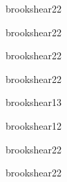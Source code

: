 \begin{syllabus}
\begin{unit}{\OSOverviewofOperatingSystemsDef}{brookshear}{2}{2}
    \OSOverviewofOperatingSystemsAllTopics
    \OSOverviewofOperatingSystemsAllObjectives
\end{unit}

\begin{unit}{\NCIntroductionDef}{brookshear}{2}{2}
   \NCIntroductionAllTopics
   \NCIntroductionAllObjectives
\end{unit}

\begin{unit}{\PLOverviewDef}{brookshear}{2}{2}
    \PLOverviewAllTopics
    \PLOverviewAllObjectives
\end{unit}

\begin{unit}{\PLVirtualMachinesDef}{brookshear}{2}{2}
    \PLVirtualMachinesAllTopics
    \PLVirtualMachinesAllObjectives
\end{unit}

\begin{unit}{\PLObjectOrientedProgrammingDef}{brookshear}{1}{3}
    \PLObjectOrientedProgrammingAllTopics
    \PLObjectOrientedProgrammingAllObjectives
\end{unit}

\begin{unit}{\PLLanguageTranslatioSystemsDef}{brookshear}{1}{2}
    \PLLanguageTranslatioSystemsAllTopics
    \PLLanguageTranslatioSystemsAllObjectives
\end{unit}

\begin{unit}{\HCFoundationsDef}{brookshear}{2}{2}
   \begin{topics}
      \item \HCFoundationsTopicMotivation
      \item \HCFoundationsTopicContext
   \end{topics}

   \begin{unitgoals}
      \item \HCFoundationsObjONE
      \item \HCFoundationsObjTWO
   \end{unitgoals}
\end{unit}

\begin{unit}{\ISFundamentalIssuesDef}{brookshear}{2}{2}
   \begin{topics}
      \item \ISFundamentalIssuesTopicHistory%
      \item \ISFundamentalIssuesTopicPhilosophical%
      \item \ISFundamentalIssuesTopicTheTuring%
   \end{topics}


\end{unit}
\end{syllabus}
